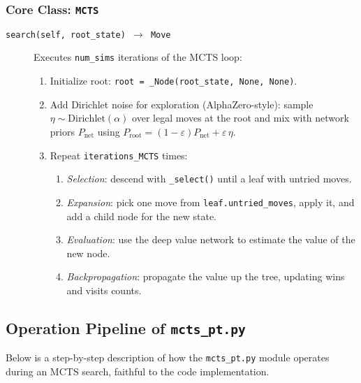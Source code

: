 \documentclass{report}
\begin{document}
\subsubsection{Core Class: \texttt{MCTS}}
\begin{description}
  \item[\texttt{search(self, root\_state) $\to$ Move}] 
    Executes \texttt{num\_sims} iterations of the MCTS loop:
    \begin{enumerate}
      \item Initialize root: \texttt{root = \_Node(root\_state, None, None)}.
      \item Add Dirichlet noise for exploration (AlphaZero-style): sample \(\eta \sim \mathrm{Dirichlet}(\alpha)\) over legal moves at the root and mix with network priors \(P_{\text{net}}\) using \(P_{\text{root}} = (1-\varepsilon)P_{\text{net}} + \varepsilon\,\eta\).
      \item Repeat \texttt{iterations\_MCTS} times:
        \begin{enumerate}
          \item \emph{Selection}: descend with \texttt{\_select()} until a leaf with untried moves.
          \item \emph{Expansion}: pick one move from \texttt{leaf.untried\_moves}, apply it, and add a child node for the new state.
          \item \emph{Evaluation}: use the deep value network to estimate the value of the new node.
          \item \emph{Backpropagation}: propagate the value up the tree, updating wins and visits counts.
        \end{enumerate}
    \end{enumerate}
\end{description}


\subsection{Operation Pipeline of \texttt{mcts\_pt.py}}
\label{sec:mcts_pipeline}
Below is a step-by-step description of how the \texttt{mcts\_pt.py} module operates during an MCTS search, faithful to the code implementation.
\end{document}
